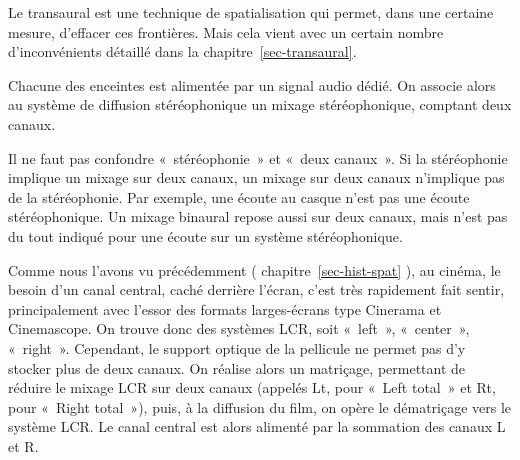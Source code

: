 \documentclass[
  letterpaper,
  DIV=11,
  numbers=noendperiod]{scrreprt}
\begin{document}
\begin{tcolorbox}[enhanced jigsaw, leftrule=.75mm, arc=.35mm, bottomtitle=1mm, colback=white, colbacktitle=quarto-callout-tip-color!10!white, opacityback=0, left=2mm, rightrule=.15mm, opacitybacktitle=0.6, breakable, toptitle=1mm, titlerule=0mm, bottomrule=.15mm, toprule=.15mm, coltitle=black, title=\textcolor{quarto-callout-tip-color}{\faLightbulb}\hspace{0.5em}{Astuce}]

Le transaural est une technique de spatialisation qui permet, dans une
certaine mesure, d'effacer ces frontières. Mais cela vient avec un
certain nombre d'inconvénients détaillé dans la
chapitre~\ref{sec-transaural}.

\end{tcolorbox}

Chacune des enceintes est alimentée par un signal audio dédié. On
associe alors au système de diffusion stéréophonique un mixage
stéréophonique, comptant deux canaux.

\begin{tcolorbox}[enhanced jigsaw, leftrule=.75mm, arc=.35mm, bottomtitle=1mm, colback=white, colbacktitle=quarto-callout-warning-color!10!white, opacityback=0, left=2mm, rightrule=.15mm, opacitybacktitle=0.6, breakable, toptitle=1mm, titlerule=0mm, bottomrule=.15mm, toprule=.15mm, coltitle=black, title=\textcolor{quarto-callout-warning-color}{\faExclamationTriangle}\hspace{0.5em}{Avertissement}]

Il ne faut pas confondre «~stéréophonie~» et «~deux canaux~». Si la
stéréophonie implique un mixage sur deux canaux, un mixage sur deux
canaux n'implique pas de la stéréophonie. Par exemple, une écoute au
casque n'est pas une écoute stéréophonique. Un mixage binaural repose
aussi sur deux canaux, mais n'est pas du tout indiqué pour une écoute
sur un système stéréophonique.

\end{tcolorbox}

Comme nous l'avons vu précédemment ( chapitre~\ref{sec-hist-spat} ), au
cinéma, le besoin d'un canal central, caché derrière l'écran, c'est très
rapidement fait sentir, principalement avec l'essor des formats
larges-écrans type Cinerama et Cinemascope. On trouve donc des systèmes
LCR, soit «~left~», «~center~», «~right~». Cependant, le support optique
de la pellicule ne permet pas d'y stocker plus de deux canaux. On
réalise alors un matriçage, permettant de réduire le mixage LCR sur deux
canaux (appelés Lt, pour «~Left total~» et Rt, pour «~Right total~»),
puis, à la diffusion du film, on opère le dématriçage vers le système
LCR. Le canal central est alors alimenté par la sommation des canaux L
et R.
\end{document}
